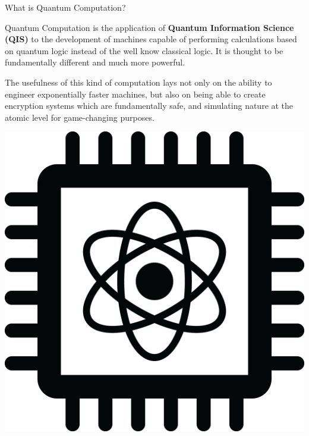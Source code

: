 \documentclass[9pt, handout, aspectratio=169]{beamer}	%
\begin{document}
	\begin{frame}{What is Quantum Computation?}

		Quantum Computation is the application of \textbf{Quantum Information Science (QIS)} to the development of machines capable of performing calculations based on quantum logic instead of the well know classical logic. It is thought to be fundamentally different and much more powerful.

		\begin{multicols}{2}

		The usefulness of this kind of computation lays not only on the ability to engineer exponentially faster machines, but also on being able to create encryption systems which are fundamentally safe, and simulating nature at the atomic level for game-changing purposes.

			\begin{center}
		\includegraphics[width=.30\paperwidth]{Figures/Quantum_Chip}
			\end{center}

		\end{multicols}

	\end{frame}


\end{document}
